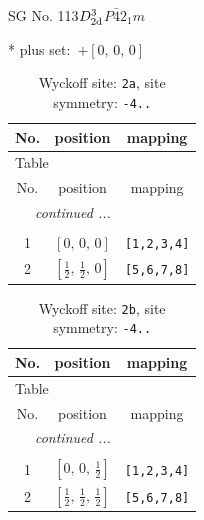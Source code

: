 \documentclass[fleqn,8pt]{jsarticle}
\begin{document}
\setcounter{MaxMatrixCols}{32}

\renewcommand{\tablename}{Table~}
\renewcommand{\figurename}{Figure~}
\begin{center}
\LARGE
SG No. 113\quad$D_{\rm 2d}^{3}$\quad$P\bar{4}2_1m$\quad[ tetragonal ]
\end{center}
* plus set:\,\,\,$+\left[ 0,\, 0,\, 0 \right]$
\renewcommand{\arraystretch}{1.2}
\begin{longtable}{ccc}
\caption{Wyckoff site: {\tt 2a}, site symmetry: {\tt -4..}}
 \\
 \hline \hline
No. & position & mapping \\ \hline \endfirsthead

\multicolumn{2}{l}{\tablename\ \thetable{}} \\
 \hline \hline
No. & position & mapping \\ \hline \endhead

 \hline \hline
\multicolumn{2}{r}{\footnotesize\it continued ...} \\ \endfoot

 \hline \hline
\multicolumn{2}{r}{} \\ \endlastfoot

1 & $\left[ 0,\, 0,\, 0 \right]$ & {\tt [1,2,3,4]} \\ \hline
2 & $\left[ \frac{1}{2},\, \frac{1}{2},\, 0 \right]$ & {\tt [5,6,7,8]} \\
\end{longtable}
\renewcommand{\arraystretch}{1.2}
\begin{longtable}{ccc}
\caption{Wyckoff site: {\tt 2b}, site symmetry: {\tt -4..}}
 \\
 \hline \hline
No. & position & mapping \\ \hline \endfirsthead

\multicolumn{2}{l}{\tablename\ \thetable{}} \\
 \hline \hline
No. & position & mapping \\ \hline \endhead

 \hline \hline
\multicolumn{2}{r}{\footnotesize\it continued ...} \\ \endfoot

 \hline \hline
\multicolumn{2}{r}{} \\ \endlastfoot

1 & $\left[ 0,\, 0,\, \frac{1}{2} \right]$ & {\tt [1,2,3,4]} \\ \hline
2 & $\left[ \frac{1}{2},\, \frac{1}{2},\, \frac{1}{2} \right]$ & {\tt [5,6,7,8]} \\
\end{longtable}
\end{document}
